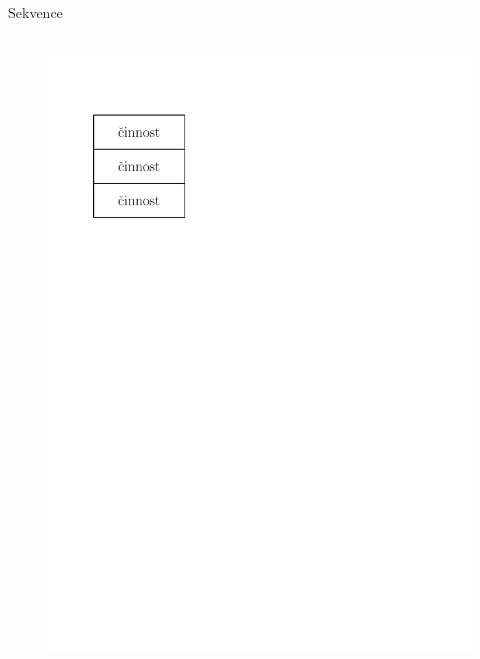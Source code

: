 \documentclass[11pt,aspectratio=169]{beamer}
\begin{document}
\begin{frame}{Sekvence}
\begin{columns}
\begin{column}{.5\textwidth}
\begin{figure}
                    \centering
                    \includegraphics[scale=.6]{../images/00-strukturogram-sekvence.pdf}
                \end{figure}
            \end{column}
        \end{columns}
    \end{frame}
\end{document}
